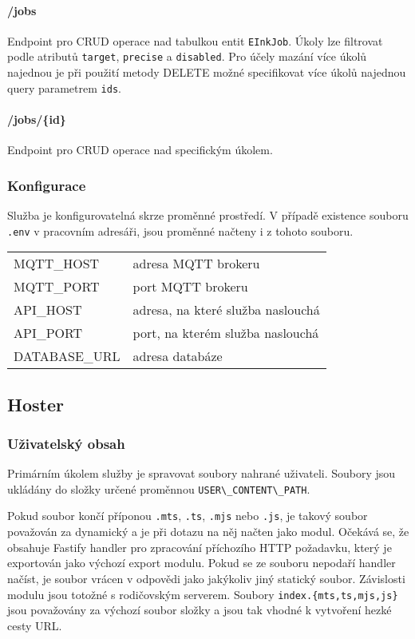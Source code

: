 \paragraph*{/jobs} Endpoint pro CRUD operace nad tabulkou entit \lstinline{EInkJob}. Úkoly lze filtrovat podle atributů \lstinline{target}, \lstinline{precise} a \lstinline{disabled}. Pro účely mazání více úkolů najednou je při použití metody DELETE možné specifikovat více úkolů najednou query parametrem \lstinline{ids}.
\paragraph*{/jobs/\{id\}} Endpoint pro CRUD operace nad specifickým úkolem.

\subsubsection{Konfigurace}
Služba je konfigurovatelná skrze proměnné prostředí. V případě existence souboru \lstinline|.env| v pracovním adresáři, jsou proměnné načteny i z tohoto souboru.

\begin{table}[h]
    \begin{tabular}{ll}
        MQTT\_HOST & adresa MQTT brokeru \\
        MQTT\_PORT & port MQTT brokeru \\
        API\_HOST & adresa, na které služba naslouchá \\
        API\_PORT & port, na kterém služba naslouchá \\
        DATABASE\_URL & adresa databáze \\
    \end{tabular}
\end{table}

\subsection{Hoster}
\subsubsection{Uživatelský obsah}
Primárním úkolem služby je spravovat soubory nahrané uživateli. Soubory jsou ukládány do složky určené proměnnou \lstinline{USER\_CONTENT\_PATH}.

Pokud soubor končí příponou \lstinline|.mts|, \lstinline|.ts|, \lstinline|.mjs| nebo \lstinline|.js|, je takový soubor považován za dynamický a je při dotazu na něj načten jako modul. Očekává se, že obsahuje Fastify handler pro zpracování příchozího HTTP požadavku, který je exportován jako výchozí export modulu. Pokud se ze souboru nepodaří handler načíst, je soubor vrácen v odpovědi jako jakýkoliv jiný statický soubor. Závislosti modulu jsou totožné s rodičovským serverem. Soubory \lstinline|index.{mts,ts,mjs,js}| jsou považovány za výchozí soubor složky a jsou tak vhodné k vytvoření hezké cesty URL.

